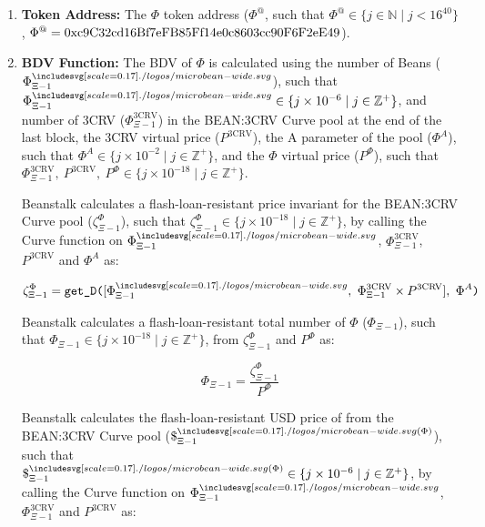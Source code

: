 \documentclass[class=article, crop=false]{standalone}
\begin{document}
\begin{enumerate}
    \item \textbf{Token Address:} The $\Phi$ token address ($\Phi^{@}$, such that $\Phi^{@} \in \{j \in \mathbb{N} \mid j < 16^{40} \}$, $\Phi^{@} = \\ \text{0xc9C32cd16Bf7eFB85Ff14e0c8603cc90F6F2eE49}$).
    
    \item \textbf{BDV Function:} The BDV of $\Phi$ is calculated using the number of Beans ($\Phi_{\Xi-1}^{\bean}$), such that $\Phi_{\Xi-1}^{\bean} \in \{j \times 10^{-6} \mid j \in \mathbb{Z}^{+} \}$, and number of 3CRV ($\Phi_{\Xi-1}^{\text{3CRV}}$) in the BEAN:3CRV Curve pool at the end of the last block, the 3CRV virtual price ($P^{\text{3CRV}}$), the A parameter of the pool ($\Phi^{A}$), such that $\Phi^{A} \in \{j \times 10^{-2} \mid j \in \mathbb{Z}^{+} \}$, and the $\Phi$ virtual price ($P^{\Phi}$), such that $\Phi_{\Xi-1}^{\text{3CRV}},\  P^{\text{3CRV}},\ P^{\Phi}\in \{j \times 10^{-18} \mid j \in \mathbb{Z}^{+} \}$. 

        Beanstalk calculates a flash-loan-resistant price invariant for the BEAN:3CRV Curve pool ($\zeta^{\Phi}_{\Xi-1}$), such that $\zeta^{\Phi}_{\Xi-1}\in \{j \times 10^{-18} \mid j \in \mathbb{Z}^{+} \}$, by calling the Curve  function on $\Phi_{\Xi-1}^{\bean}$, $\Phi_{\Xi-1}^{\text{3CRV}}$, $P^{\text{3CRV}}$ and $\Phi^{A}$ as:
        
            $$
                \zeta^{\Phi}_{\Xi-1} = 
                    \code{get\_D(}[\Phi_{\Xi-1}^{\bean},\ 
                                \Phi_{\Xi-1}^{\text{3CRV}} \times P^{\text{3CRV}}],\ 
                        \Phi^{A}\code{)}
            $$
        
        Beanstalk calculates a flash-loan-resistant total number of $\Phi$ ($\Phi_{\Xi-1}$), such that $\Phi_{\Xi-1}\in \{j \times 10^{-18} \mid j \in \mathbb{Z}^{+} \}$, from $\zeta^{\Phi}_{\Xi-1}$ and $P^{\Phi}$ as:
        
            $$
                \Phi_{\Xi-1} = \frac{\zeta^{\Phi}_{\Xi-1}}
                                {P^{\Phi}}
            $$
        
        Beanstalk calculates the flash-loan-resistant USD price of  from the BEAN:3CRV Curve pool ($\$^{\bean(\Phi)}_{\Xi-1}$), such that $\$^{\bean(\Phi)}_{\Xi-1}\in \{j \times 10^{-6} \mid j \in \mathbb{Z}^{+} \}$, by calling the Curve  function on $\Phi_{\Xi-1}^{\bean}$, $\Phi_{\Xi-1}^{\text{3CRV}}$ and $P^{\text{3CRV}}$ as:
        

\end{enumerate}
\end{document}
